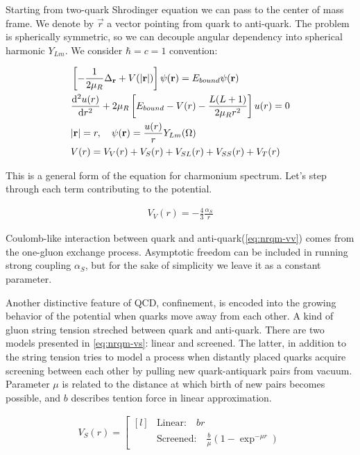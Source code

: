 Starting from two-quark Shrodinger equation we can pass to the center of mass frame. We denote by $\vec{r}$ a vector pointing from quark to anti-quark. The problem is spherically symmetric, so we can decouple angular dependency into spherical harmonic $Y_{Lm}$. We consider $\hbar = c = 1$ convention:

\begin{align}
    &\left[ -\frac{1}{2 \mu_R} \Delta_{\mathbf{r}} + V(\abs{\mathbf{r}}) \right] \psi(\mathbf{r}) = E_{bound} \psi(\mathbf{r}) \\
    &\dv[2]{u(r)}{r} + 2 \mu_R \left[ E_{bound} - V(r) - \frac{L(L+1)}{2 \mu_R r^2} \right] u(r) = 0 \\
    &\abs{\mathbf{r}} = r ,\quad \psi(\mathbf{r}) = \frac{u(r)}{r} Y_{Lm}(\Omega) \\
    &V(r) = V_V(r) +V_S(r) + V_{SL}(r) + V_{SS}(r) + V_T(r)
\end{align}

This is a general form of the equation for charmonium spectrum. Let's step through each term contributing to the potential.

\begin{align} \label{eq:nrqm-vv}
    V_V(r) = -\frac{4}{3} \frac{\alpha_S}{r}
\end{align}

Coulomb-like interaction between quark and anti-quark(\cref{eq:nrqm-vv}) comes from the one-gluon exchange process. Asymptotic freedom can be included in running strong coupling $\alpha_S$, but for the sake of simplicity we leave it as a constant parameter.

Another distinctive feature of QCD, confinement, is encoded into the growing behavior of the potential when quarks move away from each other. A kind of gluon string tension streched between quark and anti-quark. There are two models presented in \cref{eq:nrqm-vs}: linear and screened. The latter, in addition to the string tension tries to model a process when distantly placed quarks acquire screening between each other by pulling new quark-antiquark pairs from vacuum. Parameter $\mu$ is related to the distance at which birth of new pairs becomes possible, and $b$ describes tention force in linear approximation.

\begin{align} \label{eq:nrqm-vs}
    V_S(r) = \left[ \begin{matrix*}[l]
                    &\text{Linear:}\quad br \\
                    &\text{Screened:}\quad \frac{b}{\mu} (1 - \exp^{-\mu r})
              \end{matrix*} \right.
\end{align}


